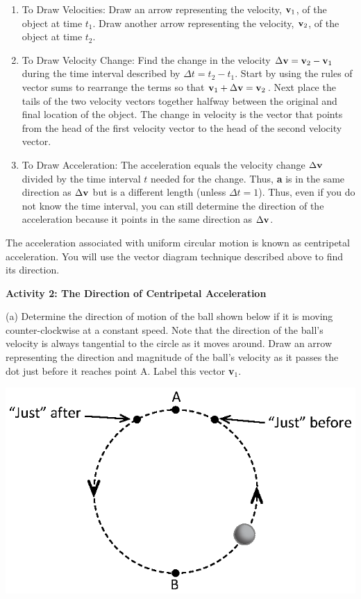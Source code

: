 \begin{enumerate}
\item To Draw Velocities: Draw an arrow representing the velocity, \( 
{\bf v}_{1} \), of
the object at time \( t_{1} \). Draw another arrow representing the velocity,
\( {\bf v}_{2} \), of the object at time \( t_{2} \). 
\item To Draw Velocity Change: Find the change in the velocity 
\( \Delta  {\bf v}
= {\bf v}_{2}  - {\bf v}_{1} \) during the time interval described
by \( \Delta  t = t_{2}  - t_{1} \). Start by using the rules of
vector sums to rearrange the terms so that \({\bf v}_{1}  +  \Delta  
{\bf v}
= {\bf v}_{2} \). Next place the tails of the two velocity vectors together
halfway between the original and final location of the object. The change in
velocity is the vector that points from the head of the first velocity vector
to the head of the second velocity vector. 
\item To Draw Acceleration: The acceleration equals the velocity change 
\( \Delta  {\bf v}\)
divided by the time interval $t$ needed for the change. Thus, \textbf{a} is in
the same direction as \( \Delta  {\bf v}\) but is a different length (unless
\( \Delta  t = 1\)). Thus, even if you do not know the time interval, you
can still determine the direction of the acceleration because it points in the
same direction as \( \Delta  {\bf v}\). 
\end{enumerate}
The acceleration associated with uniform circular motion is known as centripetal
acceleration. You will use the vector diagram technique described above to find
its direction. 

\textbf{Activity 2: The Direction of Centripetal Acceleration }

(a) Determine the direction of motion of the ball shown below if it is moving
counter-clockwise at a constant speed. Note that the direction of the ball's
velocity is always tangential to the circle as it moves around. Draw an arrow
representing the direction and magnitude of the ball's velocity as it passes
the dot just before it reaches point A. Label this vector \textbf{v}\( _{1} \). 

{\par\centering \includegraphics{circ_motion/circ_motion_fig2_new.eps} \par}

